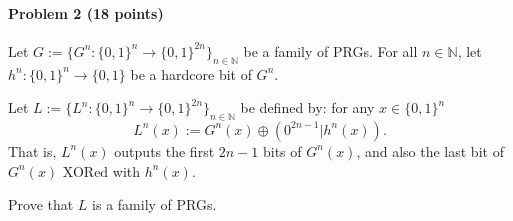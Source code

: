 \paragraph{Problem 2 (18 points)}

Let $G:=\{ G^n: \{0,1\}^n \to \{0,1\}^{2n}  \}_{n\in\mathbb{N}}$ be a family of PRGs. For all $n\in\mathbb{N}$, let $h^n: \{0,1\}^n \to \{0,1\}$ be a hardcore bit of $G^n$. 

Let $L:=\{ L^n: \{0,1\}^{n} \to \{0,1\}^{2n} \}_{n\in\mathbb{N}}$ be defined by: for any $x\in\{0,1\}^n$ 
\[ L^n(x) := G^n(x) \oplus (0^{2n-1} | h^n(x)).   \]
That is, $L^n(x)$ outputs the first $2n-1$ bits of $G^n(x)$, and also the last bit of $G^n(x)$ XORed with $h^n(x)$.

Prove that $L$ is a family of PRGs.